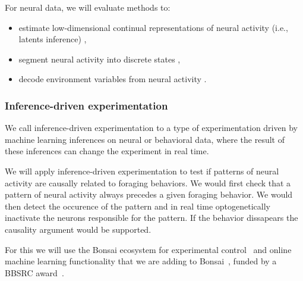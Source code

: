 For neural data, we will evaluate methods to:

\begin{itemize}

    \item estimate low-dimensional continual representations of
        neural activity (i.e., latents inference)
        \citep[e.g.,][]{mackeEtAl11,dunckerAndSahani18,walkerEtAl23,pandarinathEtAl18,saniEtAl21},

    \item segment neural activity into discrete states
        \citep[e.g.,][]{chenEtAl09,escolaEtAl11},

    \item decode environment variables from neural activity
        \citep[e.g.,][]{dengEtAl15,kloostermanEtAl14,tampuuEtAl19}.

\end{itemize}


\subsubsection{Inference-driven experimentation}

We call inference-driven experimentation to a type of experimentation driven by
machine learning inferences on neural or behavioral data, where the result of
these inferences can change the experiment in real time.

We will apply inference-driven experimentation to test if patterns of neural
activity are causally related to foraging behaviors.
%
We would first check that a pattern of neural activity always precedes a given
foraging behavior. We would then detect the occurence of the pattern and in
real time optogenetically inactivate the neurons responsible for the pattern.
%
If the behavior dissapears the causality argument would be supported.

For this we will use the Bonsai ecosystem for experimental
control~\citep{bonsai} and online machine learning functionality that we are
adding to Bonsai~\citep{bonsaiML}, funded by a BBSRC award~\citep{bbsrcAward}.

